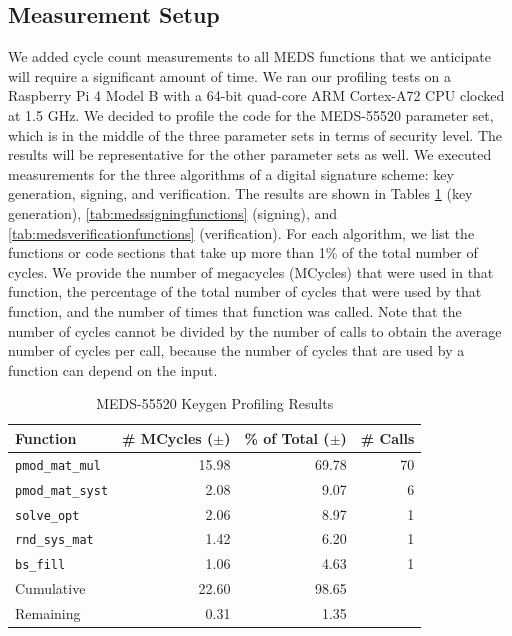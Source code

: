\documentclass[11pt,a4paper]{report}
\theoremstyle{definition}
\begin{document}
\subsection{Measurement Setup}
We added cycle count measurements to all MEDS functions that we anticipate will require a significant amount of time. We ran our profiling tests on a Raspberry Pi 4 Model B with a 64-bit quad-core ARM Cortex-A72 CPU clocked at 1.5 GHz. We decided to profile the code for the MEDS-55520 parameter set, which is in the middle of the three parameter sets in terms of security level. The results will be representative for the other parameter sets as well. We executed measurements for the three algorithms of a digital signature scheme: key generation, signing, and verification. The results are shown in Tables \ref{tab:medskeygenfunctions} (key generation), \ref{tab:medssigningfunctions} (signing), and \ref{tab:medsverificationfunctions} (verification). For each algorithm, we list the functions or code sections that take up more than 1\% of the total number of cycles. We provide the number of megacycles (MCycles) that were used in that function, the percentage of the total number of cycles that were used by that function, and the number of times that function was called. Note that the number of cycles cannot be divided by the number of calls to obtain the average number of cycles per call, because the number of cycles that are used by a function can depend on the input.

\begin{table}[]
  \centering
  \begin{tabular}{lrrr}
    \toprule
    \textbf{Function} & \textbf{\# MCycles} ($\pm$) & \textbf{\% of Total} ($\pm$) & \textbf{\# Calls} \\
    \midrule
      \texttt{pmod\_mat\_mul} & 15.98 & 69.78 & 70 \\
      \texttt{pmod\_mat\_syst} & 2.08 & 9.07 & 6 \\
      \texttt{solve\_opt} & 2.06 & 8.97 & 1 \\
      \texttt{rnd\_sys\_mat} & 1.42 & 6.20 & 1 \\
      \texttt{bs\_fill} & 1.06 & 4.63 & 1 \\
    \midrule
      Cumulative & 22.60 & 98.65 & \\
      Remaining & 0.31 & 1.35 & \\
    \bottomrule
  \end{tabular}
  \caption{MEDS-55520 Keygen Profiling Results}
  \label{tab:medskeygenfunctions}
\end{table}
\end{document}
